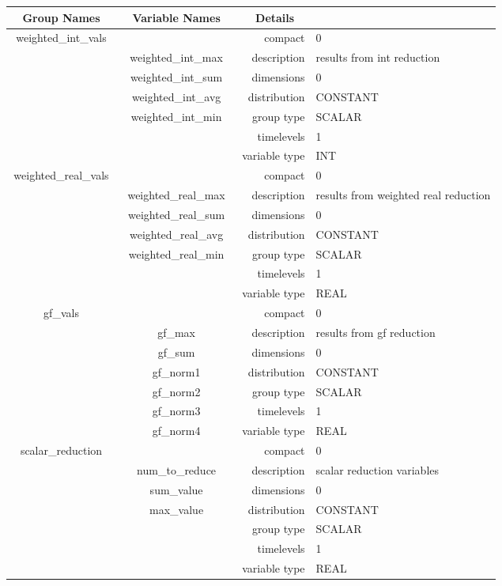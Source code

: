 \begin{tabular*}{150mm}{|c|c@{\extracolsep{\fill}}|rl|} \hline 
~ {\bf Group Names} ~ & ~ {\bf Variable Names} ~  &{\bf Details} ~ & ~ \\ 
\hline 
weighted\_int\_vals &  & compact & 0 \\ 
 & weighted\_int\_max & description & results from int reduction \\ 
 & weighted\_int\_sum & dimensions & 0 \\ 
 & weighted\_int\_avg & distribution & CONSTANT \\ 
 & weighted\_int\_min & group type & SCALAR \\ 
 &  & timelevels & 1 \\ 
 &  & variable type & INT \\ 
\hline 
weighted\_real\_vals &  & compact & 0 \\ 
 & weighted\_real\_max & description & results from weighted real reduction \\ 
 & weighted\_real\_sum & dimensions & 0 \\ 
 & weighted\_real\_avg & distribution & CONSTANT \\ 
 & weighted\_real\_min & group type & SCALAR \\ 
 &  & timelevels & 1 \\ 
 &  & variable type & REAL \\ 
\hline 
gf\_vals &  & compact & 0 \\ 
 & gf\_max & description & results from gf reduction \\ 
 & gf\_sum & dimensions & 0 \\ 
 & gf\_norm1 & distribution & CONSTANT \\ 
 & gf\_norm2 & group type & SCALAR \\ 
 & gf\_norm3 & timelevels & 1 \\ 
 & gf\_norm4 & variable type & REAL \\ 
\hline 
scalar\_reduction &  & compact & 0 \\ 
 & num\_to\_reduce & description & scalar reduction variables \\ 
 & sum\_value & dimensions & 0 \\ 
 & max\_value & distribution & CONSTANT \\ 
 &  & group type & SCALAR \\ 
 &  & timelevels & 1 \\ 
 &  & variable type & REAL \\ 
\hline 
\end{tabular*} 



